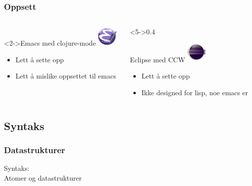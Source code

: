 \documentclass{beamer}
\begin{document}
\begin{frame}
  \frametitle{Oppsett}

  \begin{columns}[c]
    \begin{column}{0.4\textwidth}
      \begin{block}<2->{Emacs med clojure-mode}
        \centering
        \includegraphics[height=1cm]{img/emacs}
        \begin{itemize}
        \item<3-> Lett å sette opp
        \item<4-> Lett å mislike oppsettet til emacs
        \end{itemize}
      \end{block}
    \end{column}
    \begin{column}<5->{0.4\textwidth}
      \begin{block}{Eclipse med CCW}
        \centering
        \includegraphics[height=1cm]{img/eclipse}
        \begin{itemize}
        \item<6-> Lett å sette opp
        \item<7-> Ikke designed for lisp, noe emacs er
        \end{itemize}
      \end{block}
    \end{column}
  \end{columns}
  \vspace{3mm}
\end{frame}

\subsection{Syntaks}
\begin{frame}
  \frametitle{Datastrukturer}
  \begin{center}
    {\Huge Syntaks:\\ Atomer og datastrukturer}
  \end{center}
\end{frame}
\end{document}
